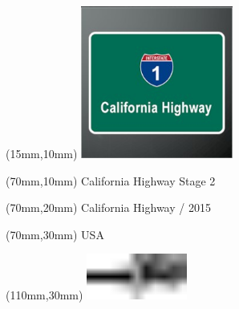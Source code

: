 \null\newpage
\begin{textblock*}{50mm}(15mm,10mm)%
\includegraphics[width=50mm]{LG/2015-05-20_00077.png}
\end{textblock*}
\begin{textblock*}{130mm}(70mm,10mm)%
{\fontsize{20}{20}\selectfont California Highway Stage 2}\\
\end{textblock*}
\begin{textblock*}{120mm}(70mm,20mm)%
{\fontsize{16}{16}\selectfont California Highway / 2015}\\
\end{textblock*}
\begin{textblock*}{120mm}(70mm,30mm)%
{\fontsize{12}{12}\selectfont USA}
\end{textblock*}
\begin{textblock*}{30mm}(110mm,30mm)%
\centering
\includegraphics[height=15mm]{icons/tofinish.pdf}
\end{textblock*}
